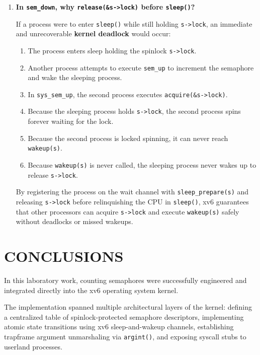 \documentclass[12pt,a4paper]{report}
\numberwithin{equation}{chapter}
\numberwithin{figure}{chapter}
\numberwithin{table}{chapter}
\begin{document}
\begin{enumerate}
    If \texttt{if} were used, the subsequent processes would proceed unconditionally, decrementing \texttt{s->value} to $-1$, violating the fundamental non-negative semaphore invariant. The \texttt{while} loop forces every awakened process to re-evaluate whether a resource unit is genuinely available; if not, it safely re-enters \texttt{sleep()}.

    \item \textbf{In \texttt{sem\_down}, why \texttt{release(\&s->lock)} before \texttt{sleep()}?}
    
    If a process were to enter \texttt{sleep()} while still holding \texttt{s->lock}, an immediate and unrecoverable \textbf{kernel deadlock} would occur:
    \begin{enumerate}
        \item The process enters sleep holding the spinlock \texttt{s->lock}.
        \item Another process attempts to execute \texttt{sem\_up} to increment the semaphore and wake the sleeping process.
        \item In \texttt{sys\_sem\_up}, the second process executes \texttt{acquire(\&s->lock)}.
        \item Because the sleeping process holds \texttt{s->lock}, the second process spins forever waiting for the lock.
        \item Because the second process is locked spinning, it can never reach \texttt{wakeup(s)}.
        \item Because \texttt{wakeup(s)} is never called, the sleeping process never wakes up to release \texttt{s->lock}.
    \end{enumerate}
    By registering the process on the wait channel with \texttt{sleep\_prepare(s)} and releasing \texttt{s->lock} before relinquishing the CPU in \texttt{sleep()}, xv6 guarantees that other processors can acquire \texttt{s->lock} and execute \texttt{wakeup(s)} safely without deadlocks or missed wakeups.
\end{enumerate}

\chapter{CONCLUSIONS}
In this laboratory work, counting semaphores were successfully engineered and integrated directly into the xv6 operating system kernel.

The implementation spanned multiple architectural layers of the kernel: defining a centralized table of spinlock-protected semaphore descriptors, implementing atomic state transitions using xv6 sleep-and-wakeup channels, establishing trapframe argument unmarshaling via \texttt{argint()}, and exposing syscall stubs to userland processes.
\end{document}

